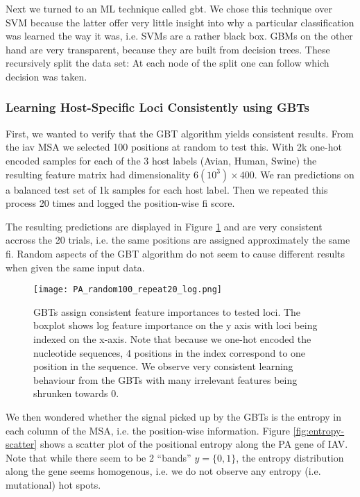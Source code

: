 Next we turned to an ML technique called \gls{gbt}. We chose this technique over SVM because the latter offer very little insight into why a particular classification was learned the way it was, i.e. SVMs are a rather black box. GBMs on the other hand are very transparent, because they are built from decision trees. These recursively split the data set: At each node of the split one can follow which decision was taken.


\subsubsection{Learning Host-Specific Loci Consistently using GBTs}

First, we wanted to verify that the GBT algorithm yields consistent results. From the \gls{iav} MSA we selected 100 positions at random to test this. With 2k one-hot encoded samples for each of the 3 host labels (Avian, Human, Swine) the resulting feature matrix had dimensionality $6(10^3) \times 400$. We ran predictions on a balanced test set of 1k samples for each host label. Then we repeated this process 20 times and logged the position-wise \gls{fi} score.

The resulting predictions are displayed in Figure \ref{fig:consistency} and are very consistent accross the 20 trials, i.e. the same positions are assigned approximately the same \gls{fi}. Random aspects of the GBT algorithm do not seem to cause different results when given the same input data.


\begin{figure}[H]
    \begin{center}\texttt{[image: PA\_random100\_repeat20\_log.png]}\end{center}
    \caption[GBTs assign consistent feature importances to tested loci.]{GBTs assign consistent feature importances to tested loci. The boxplot shows log feature importance on the y axis with loci being indexed on the x-axis. Note that because we one-hot encoded the nucleotide sequences, 4 positions in the index correspond to one position in the sequence. We observe very consistent learning behaviour from the GBTs with many irrelevant features being shrunken towards 0.}
    \label{fig:consistency}
\end{figure}


We then wondered whether the signal picked up by the GBTs is the entropy in each column of the MSA, i.e. the position-wise information. Figure \ref{fig:entropy-scatter} shows a scatter plot of the positional entropy along the PA gene of IAV. Note that while there seem to be 2 ``bands'' $y=\{0, 1\}$, the entropy distribution along the gene seems homogenous, i.e. we do not observe any entropy (i.e. mutational) hot spots.


